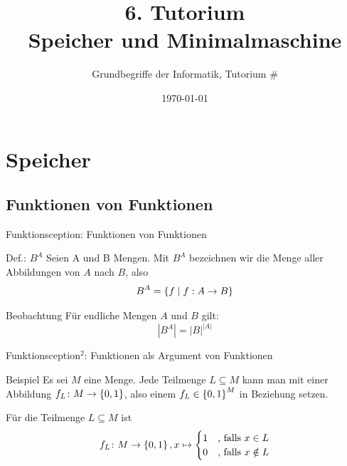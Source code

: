 




\title[Speicher und Minimalmaschine]{6. Tutorium\\ Speicher und Minimalmaschine}
\subtitle{Grundbegriffe der Informatik, Tutorium \#\mytutnumber}
\date{\today}


\titleframe
\roadmap

\section{Speicher}
\subsection{Funktionen von Funktionen}

\begin{frame}{Funktionsception: Funktionen von Funktionen}
	\begin{block}{Def.: $B^A$}
		Seien A und B Mengen. Mit $B^A$ bezeichnen wir die Menge aller Abbildungen von $A$ nach $B$, also $$B^A = \left\{ f \mid f : A \to B  \right\}$$
	\end{block}

	\begin{block}{Beobachtung}
		Für endliche Mengen $A$ und $B$ gilt:
		$$|B^A| = |B|^{|A|}$$
	\end{block}
\end{frame}

\begin{frame}{Funktionsception${}^2$: Funktionen als Argument von Funktionen}

	\begin{exampleblock}{Beispiel}
		\small Es sei $M$ eine Menge. Jede Teilmenge $L \subseteq M$ kann man mit einer Abbildung $f_L \colon M \to \left\{ 0,1 \right\}$, also einem $f_L \in \left\{ 0,1 \right\}^M$ in Beziehung setzen.

		Für die Teilmenge $L \subseteq M$ ist 
		\begin{equation*} 
			f_L \colon M \to \left\{ 0,1 \right\}, x \mapsto
			\begin{cases}
				1 & \text{, falls } x \in L \\
				0 & \text{, falls } x \notin L
			\end{cases}
		\end{equation*}
	\end{exampleblock}
\end{frame}


